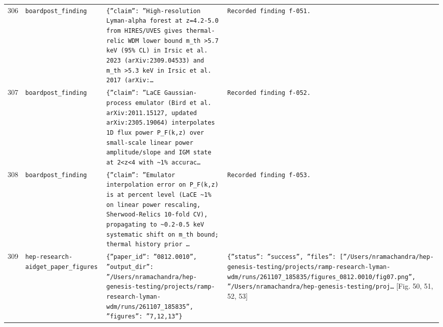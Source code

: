 \documentclass[11pt,a4paper]{article}
\begin{document}
\begin{longtable}{@{}p{}p{}p{}p{}@{}}
306 & \texttt{board}\newline\texttt{post\_\allowbreak{}finding} & \texttt{\{''claim'':\allowbreak{} ''High-resolution Lyman-alpha forest at z=\allowbreak{}4.2-5.0 from HIRES/\allowbreak{}UVES gives thermal-relic WDM lower bound m\_\allowbreak{}th \textgreater{}\allowbreak{}5.7 keV (95\% CL)\allowbreak{} in Irsic et al. 2023 (arXiv:\allowbreak{}2309.04533)\allowbreak{} and m\_\allowbreak{}th \textgreater{}\allowbreak{}5.3 keV in Irsic et al. 2017 (arXiv:\allowbreak{}\ldots{}\allowbreak{}} & \texttt{Recorded finding f-051.} \\
307 & \texttt{board}\newline\texttt{post\_\allowbreak{}finding} & \texttt{\{''claim'':\allowbreak{} ''LaCE Gaussian-process emulator (Bird et al. arXiv:\allowbreak{}2011.15127,\allowbreak{} updated arXiv:\allowbreak{}2305.19064)\allowbreak{} interpolates 1D flux power P\_\allowbreak{}F(k,\allowbreak{}z)\allowbreak{} over small-scale linear power amplitude/\allowbreak{}slope and IGM state at 2\textless{}\allowbreak{}z\textless{}\allowbreak{}4 with \textasciitilde{}\allowbreak{}1\% accurac\ldots{}\allowbreak{}} & \texttt{Recorded finding f-052.} \\
308 & \texttt{board}\newline\texttt{post\_\allowbreak{}finding} & \texttt{\{''claim'':\allowbreak{} ''Emulator interpolation error on P\_\allowbreak{}F(k,\allowbreak{}z)\allowbreak{} is at percent level (LaCE \textasciitilde{}\allowbreak{}1\% on linear power rescaling,\allowbreak{} Sherwood-Relics 10-fold CV)\allowbreak{},\allowbreak{} propagating to \textasciitilde{}\allowbreak{}0.2-0.5 keV systematic shift on m\_\allowbreak{}th bound;\allowbreak{} thermal history prior \ldots{}\allowbreak{}} & \texttt{Recorded finding f-053.} \\
309 & \texttt{hep-research-aid}\newline\texttt{get\_\allowbreak{}paper\_\allowbreak{}figures} & \texttt{\{''paper\_\allowbreak{}id'':\allowbreak{} ''0812.0010'',\allowbreak{} ''output\_\allowbreak{}dir'':\allowbreak{} ''/\allowbreak{}Users/\allowbreak{}nramachandra/\allowbreak{}hep-genesis-testing/\allowbreak{}projects/\allowbreak{}ramp-research-lyman-wdm/\allowbreak{}runs/\allowbreak{}261107\_\allowbreak{}185835'',\allowbreak{} ''figures'':\allowbreak{} ''7,\allowbreak{}12,\allowbreak{}13''\}\allowbreak{}} & \texttt{\{''status'':\allowbreak{} ''success'',\allowbreak{} ''files'':\allowbreak{} [''/\allowbreak{}Users/\allowbreak{}nramachandra/\allowbreak{}hep-genesis-testing/\allowbreak{}projects/\allowbreak{}ramp-research-lyman-wdm/\allowbreak{}runs/\allowbreak{}261107\_\allowbreak{}185835/\allowbreak{}figures\_\allowbreak{}0812.0010/\allowbreak{}fig07.png'',\allowbreak{} ''/\allowbreak{}Users/\allowbreak{}nramachandra/\allowbreak{}hep-genesis-testing/\allowbreak{}proj\ldots{}\allowbreak{}} [Fig. 50, 51, 52, 53] \\

\end{longtable}
\end{document}
